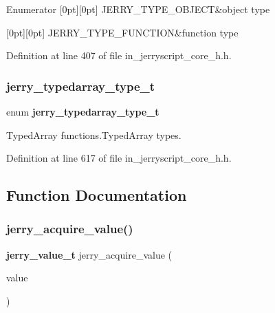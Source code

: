 \begin{DoxyEnumFields}{Enumerator}
[0pt][0pt]{}\mbox{\label{group___core_gga099a735ee6114362256082b994556782a1e80f079f3751278ff1a06cc8d5cab2b}} 
J\+E\+R\+R\+Y\+\_\+\+T\+Y\+P\+E\+\_\+\+O\+B\+J\+E\+CT&object type \\
\hline

[0pt][0pt]{}\mbox{\label{group___core_gga099a735ee6114362256082b994556782a60ef988cabe18e64605240843622b165}} 
J\+E\+R\+R\+Y\+\_\+\+T\+Y\+P\+E\+\_\+\+F\+U\+N\+C\+T\+I\+ON&function type \\
\hline

\end{DoxyEnumFields}


Definition at line 407 of file in\+\_\+jerryscript\+\_\+core\+\_\+h.\+h.

\mbox{\label{group___core_ga08fe8a90316dce8d350403a33801b64a}} 
\subsubsection{jerry\_typedarray\_type\_t}
{\footnotesize\ttfamily enum \textbf{ jerry\+\_\+typedarray\+\_\+type\+\_\+t}}

Typed\+Array functions.\+Typed\+Array types. 

Definition at line 617 of file in\+\_\+jerryscript\+\_\+core\+\_\+h.\+h.



\subsection{Function Documentation}
\mbox{\label{group___core_ga2b492f34a468e0321f9a1402c89cbc16}} 
\subsubsection{jerry\_acquire\_value()}
{\footnotesize\ttfamily \textbf{ jerry\+\_\+value\+\_\+t} jerry\+\_\+acquire\+\_\+value (\begin{DoxyParamCaption}\item[{\textbf{ jerry\+\_\+value\+\_\+t}}]{value }\end{DoxyParamCaption})}

